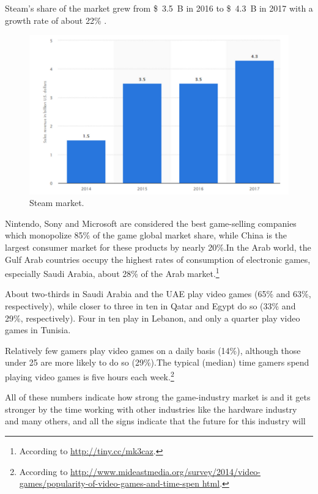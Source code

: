 \documentclass[fontsize=14pt,svgnames]{scrreprt}
\begin{document}
Steam's share of the market grew from \SI{3.5}[\$]{B} in 2016 to \SI{4.3}[\$]{B} in 2017 with a growth rate of about 22\% .
\begin{figure}[H]
\centering
  \includegraphics[width=\linewidth]{Diagrams/steam-market.png}
    \caption{\small{Steam market\protect\footnotemark.}}
  \label{fig:1}
\end{figure}
\par Nintendo, Sony and Microsoft are considered the best game-selling companies
which monopolize 85\% of the game global market share, while China is the
largest consumer market for these products by nearly 20\%.In the Arab world,
the Gulf Arab countries occupy the highest rates of consumption of electronic
games, especially Saudi Arabia, about 28\% of the Arab market.\footnote{According to \url{http://tiny.cc/mk3caz}.}
\par About two-thirds in Saudi Arabia and the UAE play video games (65\% and
63\%, respectively), while closer to three in ten in Qatar and Egypt do so (33\% and 29\%, respectively). Four in ten play in Lebanon, and only a quarter play video games in Tunisia.
\par Relatively few gamers play video games on a daily basis (14\%), although those
under 25 are more likely to do so (29\%).The typical (median) time gamers spend
playing video games is five hours each week.\footnote{According to \url{http://www.mideastmedia.org/survey/2014/video-games/popularity-of-video-games-and-time-spen
html}.}
\par All of these numbers indicate how strong the game-industry market is and it
gets stronger by the time working with other industries like the hardware industry
and many others, and all the signs indicate that the future for this industry will
\end{document}

